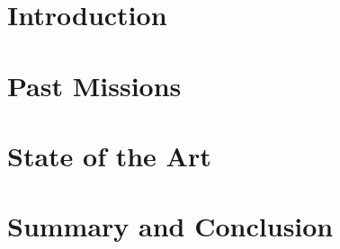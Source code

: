 
\section{Introduction}
\label{sec:Background:Introduction}


\section{Past Missions}
\label{sec:Background:PastMissions}


\section{State of the Art}
\label{sec:Background:StateOfTheArt}


\section{Summary and Conclusion}
\label{sec:Background:SummaryAndConclusion}
